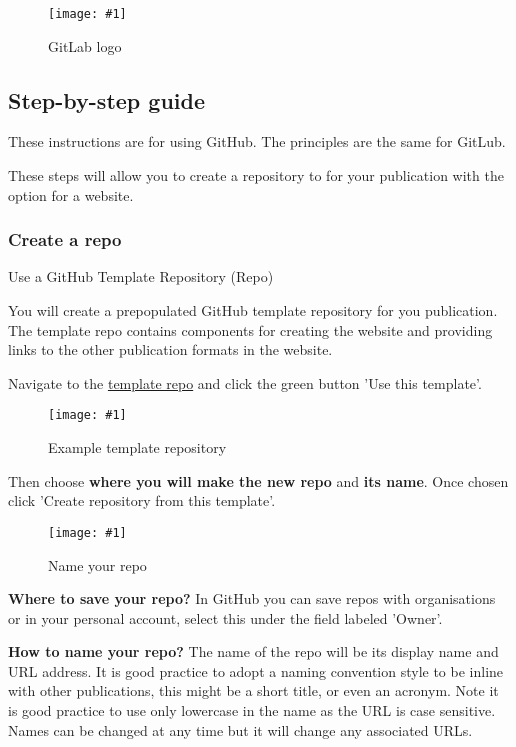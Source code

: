 \documentclass{article}
\newlength{\imgwidth}
\newcommand\scaledgraphics[2]{%
                
\settowidth{\imgwidth}{\texttt{[image: \#1]}}%
                
\setlength{\imgwidth}{\minof{\imgwidth}{#2\textwidth}}%
                
\texttt{[image: \#1]}%
                
}
\begin{document}
\begin{figure}
\scaledgraphics{6c70c3fd-31ab-446b-bfe3-5a7ee1e2f98f.png}{0.5}
\caption*{GitLab logo}\label{F88034391}
\end{figure}


\subsection{Step-by-step guide}\label{H1473428}



These instructions are for using GitHub. The principles are the same for GitLub.


These steps will allow you to create a repository to for your publication with the option for a website.


\subsubsection{Create a repo}\label{H2479402}



Use a GitHub Template Repository (Repo)


You will create a prepopulated GitHub template repository for you publication. The template repo contains components for creating the website and providing links to the other publication formats in the website.


Navigate to the \href{https://github.com/}{template repo} and click the green button 'Use this template'.

\begin{figure}
\scaledgraphics{cf59aade-4378-43a9-a64e-76013b4147a0.png}{1}
\caption*{Example template repository}\label{F25312281}
\end{figure}


Then choose \textbf{where you will make the new repo} and \textbf{its name}. Once chosen click 'Create repository from this template'.

\begin{figure}
\scaledgraphics{2a593a12-e21b-478e-8943-f75fdc9dd278.png}{1}
\caption*{Name your repo}\label{F25227021}
\end{figure}


\textbf{Where to save your repo?} In GitHub you can save repos with organisations or in your personal account, select this under the field labeled 'Owner'.


\textbf{How to name your repo?} The name of the repo will be its display name and URL address. It is good practice to adopt a naming convention style to be inline with other publications, this might be a short title, or even an acronym. Note it is good practice to use only lowercase in the name as the URL is case sensitive. Names can be changed at any time but it will change any associated URLs.
\end{document}
